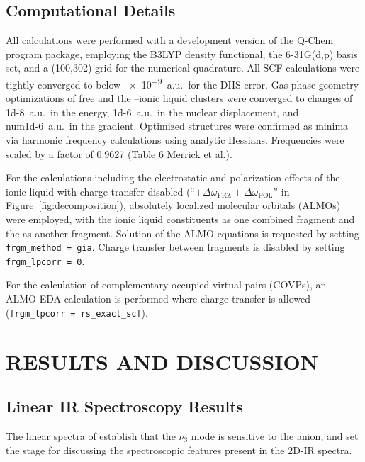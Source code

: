 {\subsection{Computational Details}

All calculations were performed with a development version of the Q-Chem program pack\-age\cite{Shao2015}, employing the B3LYP density functional, the 6-31G(d,p) basis set, and a (100,302) grid for the numerical quadrature. All SCF calculations were tightly converged to below \num{e-9}~a.u.\ for the DIIS error. Gas-phase geometry optimizations of free  and the --ionic liquid clusters were converged to changes of \num{1d-8}~a.u.\ in the energy, \num{1d-6}~a.u.\ in the nuclear displacement, and \\num{1d-6}~a.u.\ in the gradient. Optimized structures were confirmed as minima via harmonic frequency calculations using analytic Hessians. Frequencies were scaled by a factor of 0.9627 (Table 6 Merrick et al.)\cite{Merrick2007}.

For the calculations including the electrostatic and polarization effects of the ionic liquid with charge transfer disabled (``$+ \Delta \omega_\mathrm{FRZ} + \Delta \omega_\mathrm{POL}$'' in Figure~\ref{fig:decomposition}), absolutely localized molecular orbitals (ALMOs)\cite{Khaliullin2006} were employed, with the ionic liquid constituents as one combined fragment and the  as another fragment. Solution of the ALMO equations is requested by setting \verb!frgm_method = gia!. Charge transfer between fragments is disabled by setting \verb!frgm_lpcorr = 0!.

For the calculation of complementary occupied-virtual pairs (COVPs), an ALMO-EDA calculation is performed where charge transfer is allowed (\verb!frgm_lpcorr = rs_exact_scf!).

\section{RESULTS AND DISCUSSION}
\subsection{Linear IR Spectroscopy Results}
\label{sec:anions_linear}
The linear spectra of  establish that the $\nu_3$ mode is sensitive to the anion, and set the stage for discussing the spectroscopic features present in the 2D-IR spectra.

}
